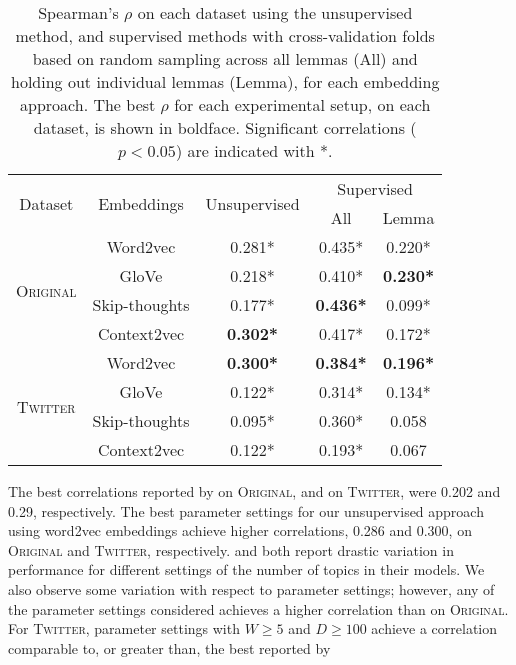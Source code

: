 \documentclass[11pt]{article}
\newcommand\original{\textsc{Original}\xspace}
\newcommand\twitter{\textsc{Twitter}\xspace}
\newcommand\glove{GloVe\xspace}
\begin{document}
\begin{table}
\begin{center}
\small
\setlength{\tabcolsep}{2pt}
\begin{tabular}{ccccc}
\multirow{2}{*}{Dataset} & \multirow{2}{*}{Embeddings} & \multirow{2}{*}{Unsupervised} & \multicolumn{2}{c}{Supervised} \\
& & & All & Lemma \\
\hline
\multirow{4}{*}{\textsc{Original}} & Word2vec & 0.281* & 0.435* & 0.220* \\
 & \glove & 0.218* & 0.410* & \textbf{0.230*} \\
 & Skip-thoughts & 0.177* & \textbf{0.436*} & 0.099* \\
 & Context2vec & \textbf{0.302*} & 0.417* & 0.172* \\
\hline
\multirow{4}{*}{\textsc{Twitter}} & Word2vec & \textbf{0.300*} & \textbf{0.384*} & \textbf{0.196*} \\
 & \glove & 0.122* & 0.314* & 0.134*\\
 & Skip-thoughts & 0.095* & 0.360* & 0.058\phantom{*} \\
 & Context2vec & 0.122* &0.193*  & 0.067\phantom{*} \\
\hline
\end{tabular}
\caption{Spearman's $\rho$ on each dataset using the unsupervised
  method, and supervised methods with cross-validation folds based on
  random sampling across all lemmas (All) and holding out individual
  lemmas (Lemma), for each embedding approach. The best $\rho$ for
  each experimental setup, on each dataset, is shown in
  boldface. Significant correlations ($p<0.05$) are indicated with
  *.\label{tab:otherresults}}
\end{center}
\end{table}



The best correlations reported by \cite{LuiBaldwin2012} on \original,
and \cite{Gella+:2013} on \twitter, were 0.202 and 0.29,
respectively. The best parameter settings for our unsupervised
approach using word2vec embeddings achieve higher correlations, 0.286
and 0.300, on \original and \twitter,
respectively. \citeauthor{LuiBaldwin2012} and \citeauthor{Gella+:2013}
both report drastic variation in performance for different settings of
the number of topics in their models. We also observe some variation
with respect to parameter settings; however, any of the parameter
settings considered achieves a higher correlation than
\citeauthor{LuiBaldwin2012} on \original. For \twitter, parameter
settings with $W \geq 5$ and $D \geq 100$ achieve a correlation
comparable to, or greater than, the best reported by
\citeauthor{Gella+:2013}
\end{document}
